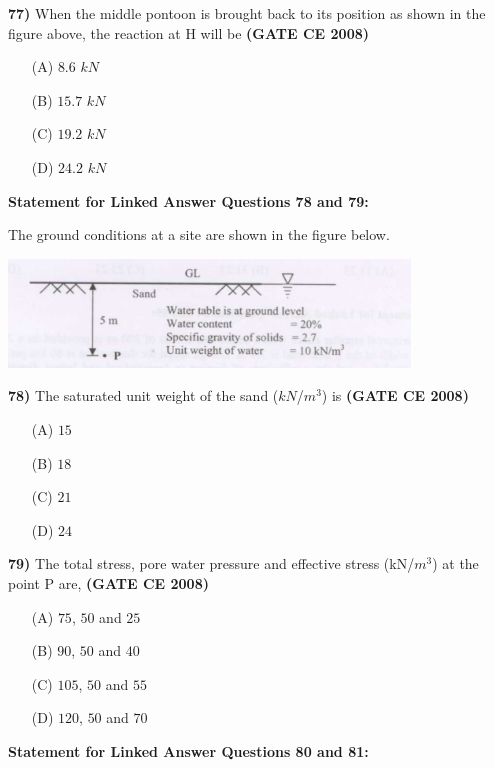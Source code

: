 \documentclass[journal]{IEEEtran}
\begin{document}
\begin{enumerate}
\textbf{77)} \hspace{0.2cm} When the middle pontoon is brought back to its position as shown in the figure above, the reaction at H will be \textbf{(GATE CE 2008)}
\begin{itemize}
    \item[(A)] $8.6$ $kN$
    \item[(B)] $15.7$ $kN$
    \item[(C)] $19.2$ $kN$
    \item[(D)] $24.2$ $kN$
\end{itemize}

\vspace{0.5cm}
\textbf{Statement for Linked Answer Questions 78 and 79:}

The ground conditions at a site are shown in the figure below.

\vspace{0.3cm}
\includegraphics[width=0.8\textwidth]{figs/fig12.png}
\vspace{0.3cm}

\textbf{78)} The saturated unit weight of the sand ($kN$/$m^{3}$) is \textbf{(GATE CE 2008)}
\begin{itemize}
    \item[(A)] $15$
    \item[(B)] $18$
    \item[(C)] $21$
    \item[(D)] $24$
\end{itemize}

\textbf{79)} The total stress, pore water pressure and effective stress (kN/$m^{3}$) at the point P are,  \textbf{(GATE CE 2008)}
\begin{itemize}
    \item[(A)] $75$, $50$ and $25$
    \item[(B)] $90$, $50$ and $40$
    \item[(C)] $105$, $50$ and $55$
    \item[(D)] $120$, $50$ and $70$
\end{itemize}



\textbf{Statement for Linked Answer Questions 80 and 81:}


\end{enumerate}
\end{document}

